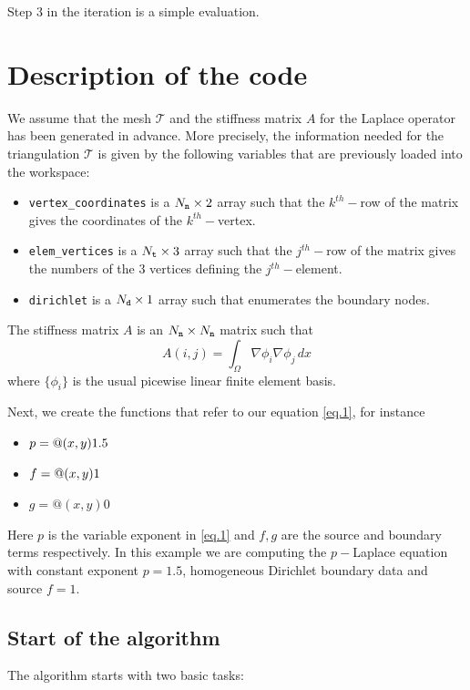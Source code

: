 \documentclass[11pt]{amsart}
\theoremstyle{remark}
\theoremstyle{definition}
\numberwithin{equation}{section}
\begin{document}
Step 3 in the iteration is a simple evaluation.



\section{Description of the code}

We assume that the mesh $\mathcal T$ and the stiffness matrix $A$ for the Laplace operator has been generated in advance. More precisely, the information needed for the triangulation $\mathcal T$ is given by the following variables that are previously loaded into the workspace:
\begin{itemize}
\item {\tt vertex\_coordinates} is a $N_{\tt n}\times 2$ array such that the $k^{th}-$row of the matrix gives the coordinates of the $k^{th}-$vertex.

\item {\tt elem\_vertices} is a $N_{\tt t} \times 3$ array such that the $j^{th}-$row of the matrix gives the numbers of the 3 vertices defining the $j^{th}-$element.

\item {\tt dirichlet} is a $N_{\tt d}\times 1$ array such that enumerates the boundary nodes.
\end{itemize}

The stiffness matrix $A$ is an $N_{\tt n}\times N_{\tt n}$ matrix such that
$$
A(i,j) = \int_\Omega \nabla \phi_i\nabla \phi_j\, dx
$$
where $\{\phi_i\}$ is the usual picewise linear finite element basis.

Next, we create the functions that refer to our equation \eqref{eq.1}, for instance
\begin{itemize}
\item $p = {\tt @}(x,y) 1.5$

\item $f= {\tt @}(x,y) 1$

\item $g= @(x,y)0$
\end{itemize}

Here $p$ is the variable exponent in \eqref{eq.1} and $f, g$ are the source and boundary terms respectively. In this example we are computing the $p-$Laplace equation with constant exponent $p=1.5$, homogeneous Dirichlet boundary data and source $f=1$.

\subsection{Start of the algorithm}
The algorithm starts with two basic tasks:
\end{document}

